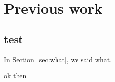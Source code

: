 \chapter{Previous work}

\section{test}\label{sec:test}

In Section~\ref{sec:what}, we said what.

ok then

